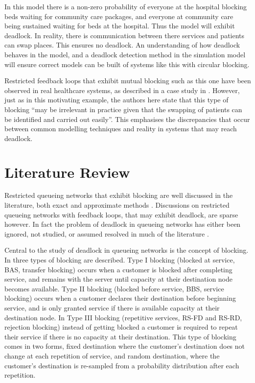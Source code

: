 \documentclass{article}
\numberwithin{equation}{section}
\begin{document}
In this model there is a non-zero probability of everyone at the hospital
blocking beds waiting for community care packages, and everyone at community
care being sustained waiting for beds at the hospital.
Thus the model will exhibit deadlock.
In reality, there is communication between there services and patients can
swap places.
This ensures no deadlock.
An understanding of how deadlock behaves in the model, and a deadlock
detection method in the simulation model will ensure correct models can be
built of systems like this with circular blocking.

Restricted feedback loops that exhibit mutual blocking such as this one have
been observed in real healthcare systems, as described in a case study in
\cite{osoriobierlaire09}.
However, just as in this motivating example, the authors here state that this
type of blocking ``may be irrelevant in practice given that the swapping of
patients can be identified and carried out easily''.
This emphasises the discrepancies that occur between common modelling
techniques and reality in systems that may reach deadlock.


\section{Literature Review}\label{sec:litreview}

Restricted queueing networks that exhibit blocking are well discussed in the
literature, both exact \cite{hunt56, baber08, aviitzhakyadin65, koizumietal05,
latoucheneuts80, perrosetal88, gordonnewell67} and approximate methods
\cite{takahashi80, korporaaletal00, onvural90, perrosetal88, dalleryfrein93,
allonetal13, osoriobierlaire09}.
Discussions on restricted queueing networks with feedback loops, that may
exhibit deadlock, are sparse however.
In fact the problem of deadlock in queueing networks has either been ignored,
not studied, or assumed resolved in much of the literature \cite{onvural90,
perrosetal88, osoriobierlaire09}.

Central to the study of deadlock in queueing networks is the concept of
blocking.
In \cite{onvuralperros86} three types of blocking are described.
Type I blocking (blocked at service, BAS, transfer blocking) occurs when a
customer is blocked after completing service, and remains with the server
until capacity at their destination node becomes available.
Type II blocking (blocked before service, BBS, service blocking) occurs when a
customer declares their destination before beginning service, and is only
granted service if there is available capacity at their destination node.
In Type III blocking (repetitive services, RS-FD and RS-RD, rejection
blocking) instead of getting blocked a customer is required to repeat their
service if there is no capacity at their destination.
This type of blocking comes in two forms, fixed destination where the
customer's destination does not change at each repetition of service, and
random destination, where the customer's destination is re-sampled from a
probability distribution after each repetition.
\end{document}
